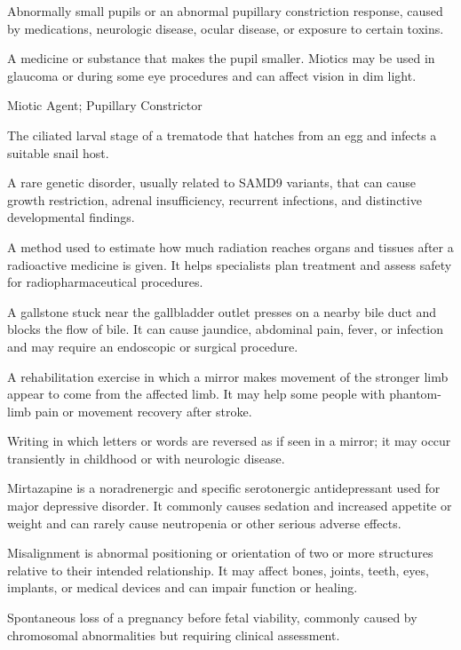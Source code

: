  Abnormally small pupils or an abnormal pupillary constriction response, caused by medications, neurologic disease, ocular disease, or exposure to certain toxins.

 A medicine or substance that makes the pupil smaller. Miotics may be used in glaucoma or during some eye procedures and can affect vision in dim light.

\synonyms
Miotic Agent; Pupillary Constrictor

 The ciliated larval stage of a trematode that hatches from an egg and infects a suitable snail host.

 A rare genetic disorder, usually related to SAMD9 variants, that can cause growth restriction, adrenal insufficiency, recurrent infections, and distinctive developmental findings.

 A method used to estimate how much radiation reaches organs and tissues after a radioactive medicine is given. It helps specialists plan treatment and assess safety for radiopharmaceutical procedures.

 A gallstone stuck near the gallbladder outlet presses on a nearby bile duct and blocks the flow of bile. It can cause jaundice, abdominal pain, fever, or infection and may require an endoscopic or surgical procedure.

 A rehabilitation exercise in which a mirror makes movement of the stronger limb appear to come from the affected limb. It may help some people with phantom-limb pain or movement recovery after stroke.

 Writing in which letters or words are reversed as if seen in a mirror; it may occur transiently in childhood or with neurologic disease.

 Mirtazapine is a noradrenergic and specific serotonergic antidepressant used for major depressive disorder. It commonly causes sedation and increased appetite or weight and can rarely cause neutropenia or other serious adverse effects.

 Misalignment is abnormal positioning or orientation of two or more structures relative to their intended relationship. It may affect bones, joints, teeth, eyes, implants, or medical devices and can impair function or healing.

 Spontaneous loss of a pregnancy before fetal viability, commonly caused by chromosomal abnormalities but requiring clinical assessment.

